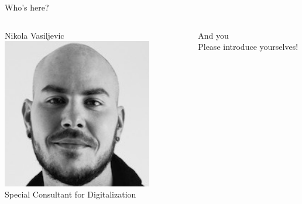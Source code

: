 \begin{frame}{Who's here?}
\begin{columns}[t]
        \begin{column}{.3\textwidth}
            \begin{block}{Nikola Vasiljevic}
            \centering
            \includegraphics[width=0.8\textwidth]{images/Vasiljevic_Headshot.png}\\
            Special Consultant for Digitalization \\
            \end{block}
        \end{column}
        
        \begin{column}{.3\textwidth}
            \begin{block}{And you}
            \centering
            {\fontsize{100}{120}\selectfont\faUsers}\\
            Please introduce yourselves!
            \end{block}
        \end{column}
    \end{columns}

\end{frame}